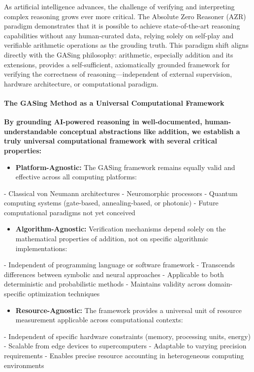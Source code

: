 As artificial intelligence advances, the challenge of verifying and interpreting complex reasoning grows ever more critical. The Absolute Zero Reasoner (AZR) paradigm demonstrates that it is possible to achieve state-of-the-art reasoning capabilities without any human-curated data, relying solely on self-play and verifiable arithmetic operations as the grouding truth. This paradigm shift aligns directly with the GASing philosophy: arithmetic, especially addition and its extensions, provides a self-sufficient, axiomatically grounded framework for verifying the correctness of reasoning—independent of external supervision, hardware architecture, or computational paradigm.
\paragraph{The GASing Method as a Universal Computational Framework}

\textbf{By grounding AI-powered reasoning in well-documented, human-understandable conceptual abstractions like addition, we establish a truly universal computational framework with several critical properties:}

\begin{itemize}
\item \textbf{Platform-Agnostic:} The GASing framework remains equally valid and effective across all computing platforms:
\end{itemize}
  - Classical von Neumann architectures
  - Neuromorphic processors
  - Quantum computing systems (gate-based, annealing-based, or photonic)
  - Future computational paradigms not yet conceived

\begin{itemize}
\item \textbf{Algorithm-Agnostic:} Verification mechanisms depend solely on the mathematical properties of addition, not on specific algorithmic implementations:
\end{itemize}
  - Independent of programming language or software framework
  - Transcends differences between symbolic and neural approaches
  - Applicable to both deterministic and probabilistic methods
  - Maintains validity across domain-specific optimization techniques

\begin{itemize}
\item \textbf{Resource-Agnostic:} The framework provides a universal unit of resource measurement applicable across computational contexts:
\end{itemize}
  - Independent of specific hardware constraints (memory, processing units, energy)
  - Scalable from edge devices to supercomputers
  - Adaptable to varying precision requirements
  - Enables precise resource accounting in heterogeneous computing environments

